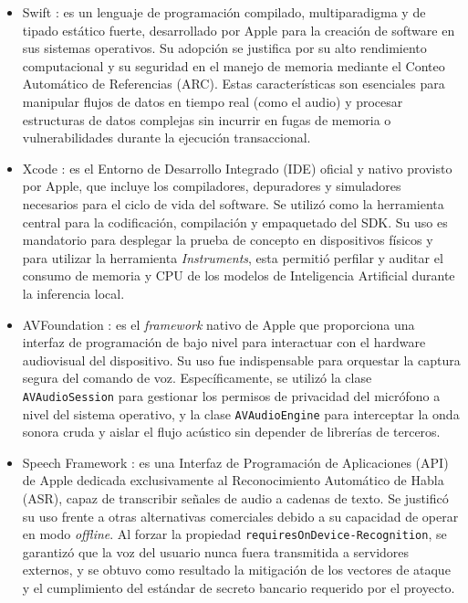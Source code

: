 \begin{itemize}

    \item Swift \citep{apple2026swiftlanguage}: es un lenguaje de programación compilado, multiparadigma y de tipado estático fuerte, desarrollado por Apple para la creación de software en sus sistemas operativos. Su adopción se justifica por su alto rendimiento computacional y su seguridad en el manejo de memoria mediante el Conteo Automático de Referencias (ARC). Estas características son esenciales para manipular flujos de datos en tiempo real (como el audio) y procesar estructuras de datos complejas sin incurrir en fugas de memoria o vulnerabilidades durante la ejecución transaccional.

    \item Xcode \citep{apple2026xcode}: es el Entorno de Desarrollo Integrado (IDE) oficial y nativo provisto por Apple, que incluye los compiladores, depuradores y simuladores necesarios para el ciclo de vida del software. Se utilizó como la herramienta central para la codificación, compilación y empaquetado del SDK. Su uso es mandatorio para desplegar la prueba de concepto en dispositivos físicos y para utilizar la herramienta \textit{Instruments}, esta permitió perfilar y auditar el consumo de memoria y CPU de los modelos de Inteligencia Artificial durante la inferencia local.

    \item AVFoundation \citep{apple2026avfoundation}: es el \textit{framework} nativo de Apple que proporciona una interfaz de programación de bajo nivel para interactuar con el hardware audiovisual del dispositivo. Su uso fue indispensable para orquestar la captura segura del comando de voz. Específicamente, se utilizó la clase \texttt{AVAudioSession} para gestionar los permisos de privacidad del micrófono a nivel del sistema operativo, y la clase \texttt{AVAudioEngine} para interceptar la onda sonora cruda y aislar el flujo acústico sin depender de librerías de terceros.

    \item Speech Framework \citep{apple2026speech}: es una Interfaz de Programación de Aplicaciones (API) de Apple dedicada exclusivamente al Reconocimiento Automático de Habla (ASR), capaz de transcribir señales de audio a cadenas de texto. Se justificó su uso frente a otras alternativas comerciales debido a su capacidad de operar en modo \textit{offline}. Al forzar la propiedad \lstinline|requiresOnDevice-Recognition|, se garantizó que la voz del usuario nunca fuera transmitida a servidores externos, y se obtuvo como resultado la mitigación de los vectores de ataque y el cumplimiento del estándar de secreto bancario requerido por el proyecto.


\end{itemize}
